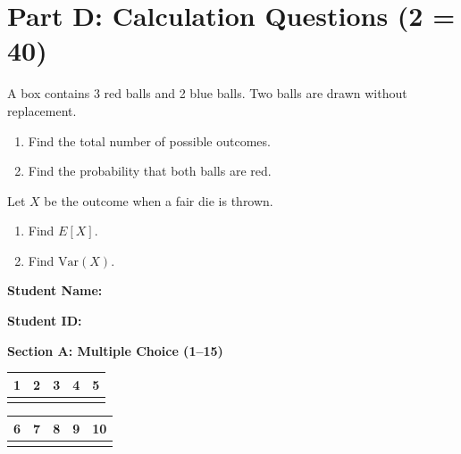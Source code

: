 \documentclass{USTBExam}
\begin{document}
\section{Part D: Calculation Questions (2  = 40)}

\begin{problem}
A box contains 3 red balls and 2 blue balls. Two balls are drawn without replacement.
\begin{enumerate}
\item Find the total number of possible outcomes.
\item Find the probability that both balls are red.
\end{enumerate}
\end{problem}

\begin{problem}
Let $X$ be the outcome when a fair die is thrown.
\begin{enumerate}
\item Find $E[X]$.
\item Find $\mathrm{Var}(X)$.
\end{enumerate}
\end{problem}


\newpage

\noindent\textbf{Student Name:} \underline{\hspace{6cm}}

\textbf{Student ID:} \underline{\hspace{6cm}}

\vspace{0.6cm}
\noindent\textbf{Section A: Multiple Choice (1--15)}\\[0.2cm]
\noindent
\begin{tabular}{|c|c|c|c|c|}
\hline
1 & 2 & 3 & 4 & 5  \\
\hline
\underline{\hspace{1.6cm}} & \underline{\hspace{1.6cm}} & \underline{\hspace{1.6cm}} & \underline{\hspace{1.6cm}} & \underline{\hspace{1.6cm}}  \\
\hline
\end{tabular}

\begin{tabular}{|c|c|c|c|c|}
\hline
6 & 7 & 8 & 9 & 10  \\
\hline
\underline{\hspace{1.6cm}} & \underline{\hspace{1.6cm}} & \underline{\hspace{1.6cm}} & \underline{\hspace{1.6cm}} & \underline{\hspace{1.6cm}}  \\
\hline
\end{tabular}
\end{document}
